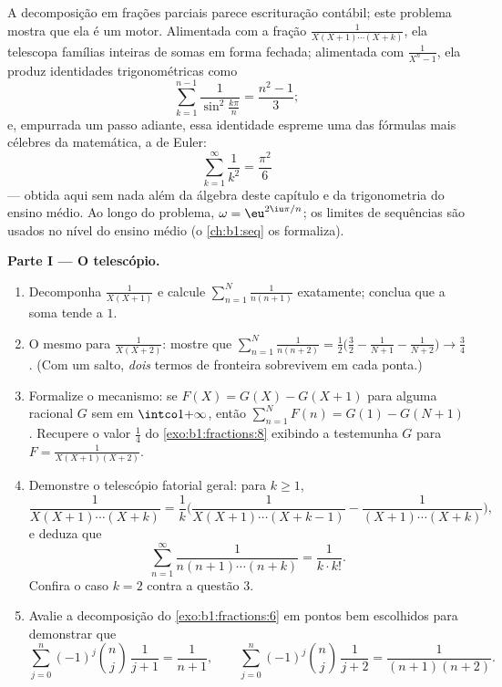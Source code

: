 \begin{problem}\label{pb:b1:fractions:1}
A decomposição em frações parciais parece escrituração contábil; este
problema mostra que ela é um motor. Alimentada com a fração
$\frac1{X(X+1)\cdots(X+k)}$, ela telescopa famílias inteiras de somas
em forma fechada; alimentada com $\frac1{X^n - 1}$, ela produz
identidades trigonométricas como
\[
\sum_{k=1}^{n-1}\frac{1}{\sin^2\frac{k\pi}{n}} = \frac{n^2-1}{3} ;
\]
e, empurrada um passo adiante, essa identidade espreme uma das
fórmulas mais célebres da matemática, a de Euler:
\[
\sum_{k=1}^{\infty}\frac1{k^2} = \frac{\pi^2}{6}
\]
--- obtida aqui sem nada além da álgebra deste capítulo e da
trigonometria do ensino médio.
Ao longo do problema, $\omega = \eu^{2\iu\pi/n}$; os limites de sequências são
usados no nível do ensino médio (o \cref{ch:b1:seq} os formaliza).

\medskip
\noindent\textbf{Parte I --- O telescópio.}
\begin{enumerate}
  \item Decomponha $\frac1{X(X+1)}$ e calcule $\sum_{n=1}^{N}
        \frac1{n(n+1)}$ exatamente; conclua que a soma tende a
        $1$.
  \item O mesmo para $\frac1{X(X+2)}$: mostre que $\sum_{n=1}^{N}
        \frac1{n(n+2)} = \frac12\bigl(\frac32 - \frac1{N+1} -
        \frac1{N+2}\bigr) \to \frac34$. (Com um salto, \emph{dois}
        termos de fronteira sobrevivem em cada ponta.)
  \item Formalize o mecanismo: se $F(X) = G(X) - G(X+1)$ para
        alguma racional $G$ sem  em $\intco1{+\infty}$,
        então $\sum_{n=1}^N F(n) = G(1) - G(N+1)$. Recupere o
        valor $\frac14$ do \cref{exo:b1:fractions:8} exibindo
        a testemunha $G$ para $F = \frac1{X(X+1)(X+2)}$.
  \item Demonstre o telescópio fatorial geral: para $k \geq 1$,
        \[
        \frac{1}{X(X+1)\cdots(X+k)}
        = \frac1k\biggl(\frac{1}{X(X+1)\cdots(X+k-1)}
        - \frac{1}{(X+1)\cdots(X+k)}\biggr),
        \]
        e deduza que
        \[
        \sum_{n=1}^{\infty}\frac{1}{n(n+1)\cdots(n+k)}
        = \frac{1}{k \cdot k!} .
        \]
        Confira o caso $k = 2$ contra a questão 3.
  \item Avalie a decomposição do \cref{exo:b1:fractions:6}
        em pontos bem escolhidos para demonstrar que
        \[
        \sum_{j=0}^{n}(-1)^j\binom nj\,\frac1{j+1}
        = \frac1{n+1},
        \qquad
        \sum_{j=0}^{n}(-1)^j\binom nj\,\frac1{j+2}
        = \frac1{(n+1)(n+2)} .
        \]
\end{enumerate}


\end{problem}
